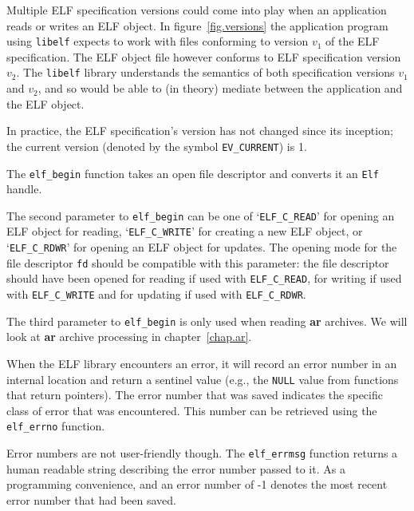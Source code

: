 \documentclass[a4paper,pdftex]{book}
\makeatletter
\newcommand{\constant}[1]{\texttt{#1}}
\newcommand{\function}[1]{\texttt{#1}}
\newcommand{\library}[1]{\texttt{#1}}
\newcommand{\parameter}[1]{\texttt{#1}}
\newcommand{\tool}[1]{\textbf{#1}}
\newcommand{\type}[1]{\texttt{#1}}
\newenvironment{callout}[2][black]{%
  \begingroup\newcommand{\@cocolor}{#1}%
  \setlength{\shadowsize}{1.2pt}%
  \newcommand{\@cogroup}[1]{#2}}{\endgroup}
\newcommand{\@co}[1]{\shadowbox{\color{\@cocolor}#1}}
\newcommand{\coref}[1]{%
  \hypertarget{\@cogroup.#1.cr}{%
    \hyperlink{\@cogroup.#1.co}{\@co{#1}}}}
\makeatother
\begin{document}
\begin{callout}{prog1}
\begin{description}
    Multiple ELF specification versions could come into play when an
    application reads or writes an ELF object.  In
    figure~\vref{fig.versions} the application program using
    \library{libelf} expects to work with files conforming to version
    $v_1$ of the ELF specification. The ELF object file however
    conforms to ELF specification version $v_2$.  The \library{libelf}
    library understands the semantics of both specification versions
    $v_1$ and $v_2$, and so would be able to (in theory) mediate
    between the application and the ELF object.

    In practice, the ELF specification's version has not changed since
    its inception; the current version (denoted by the symbol
    \constant{EV\_CURRENT}) is 1.

  \item[\coref{5}] The \function{elf\_begin} function takes an open
    file descriptor and converts it an \type{Elf} handle.

    The second parameter to \function{elf\_begin} can be one of
    `\constant{ELF\_C\_READ}' for opening an ELF object for reading,
    `\constant{ELF\_C\_WRITE}' for creating a new ELF object, or
    `\constant{ELF\_C\_RDWR}' for opening an ELF object for updates.
    The opening mode for the file descriptor \parameter{fd} should be
    compatible with this parameter: the file descriptor should have
    been opened for reading if used with \constant{ELF\_C\_READ}, for
    writing if used with \constant{ELF\_C\_WRITE} and for updating if
    used with \constant{ELF\_C\_RDWR}.

    The third parameter to \function{elf\_begin} is only used when
    reading \tool{ar} ar\-chives.  We will look at \tool{ar} archive
    processing in chapter~\vref{chap.ar}.

  \item[\coref{6}] When the ELF library encounters an error, it will
    record an error number in an internal location and return a
    sentinel value (e.g., the \constant{NULL} value from functions
    that return pointers). The error number that was saved indicates
    the specific class of error that was encountered. This number can
    be retrieved using the \function{elf\_errno} function.

    Error numbers are not user-friendly though. The
    \function{elf\_errmsg} function returns a human readable string
    describing the error number passed to it.  As a programming
    convenience, and an error number of -1 denotes the most recent
    error number that had been saved.


\end{description}
\end{callout}
\end{document}
